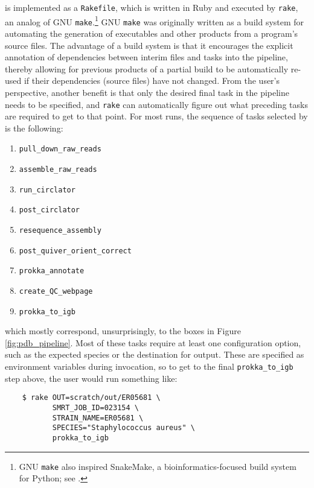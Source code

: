 \pathogendbpipeline{} is implemented as a \texttt{Rakefile}, which is written in Ruby and executed by \texttt{rake}, an analog of GNU \texttt{make}.\footnote{GNU \texttt{make} also inspired SnakeMake, a bioinformatics-focused build system for Python; see \textcite{Koster2012}.} GNU \texttt{make} was originally written as a build system for automating the generation of executables and other products from a program's source files. The advantage of a build system is that it encourages the explicit annotation of dependencies between interim files and tasks into the pipeline, thereby allowing for previous products of a partial build to be automatically re-used if their dependencies (source files) have not changed. From the user's perspective, another benefit is that only the desired final task in the pipeline needs to be specified, and \texttt{rake} can automatically figure out what preceding tasks are required to get to that point. For most runs, the sequence of tasks selected by \pathogendbpipeline{} is the following:

\begin{enumerate}[label=\arabic*.,noitemsep,labelindent=2em,leftmargin=!]
\item \verb|pull_down_raw_reads|
\item \verb|assemble_raw_reads|
\item \verb|run_circlator|
\item \verb|post_circlator|
\item \verb|resequence_assembly|
\item \verb|post_quiver_orient_correct|
\item \verb|prokka_annotate|
\item \verb|create_QC_webpage|
\item \verb|prokka_to_igb|
\end{enumerate}

which mostly correspond, unsurprisingly, to the boxes in Figure \ref{fig:pdb_pipeline}. Most of these tasks require at least one configuration option, such as the expected species or the destination for output. These are specified as environment variables during invocation, so to get to the final \verb|prokka_to_igb| step above, the user would run something like:

\begin{verbatim}
    $ rake OUT=scratch/out/ER05681 \
           SMRT_JOB_ID=023154 \
           STRAIN_NAME=ER05681 \
           SPECIES="Staphylococcus aureus" \
           prokka_to_igb
\end{verbatim}

